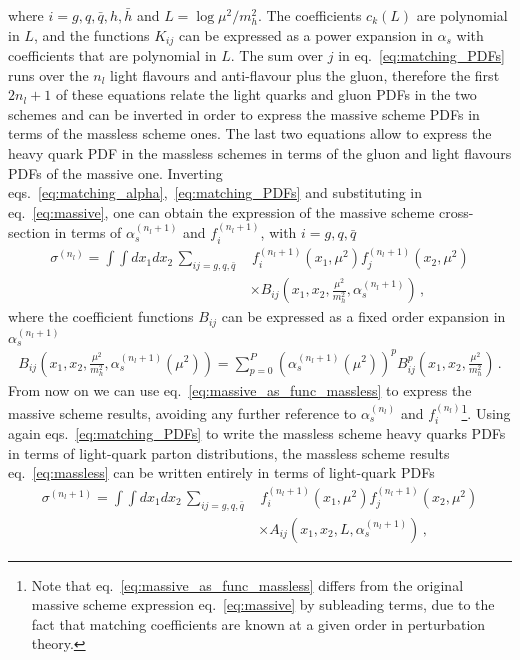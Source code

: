 where $i = g, q, \bar{q}, h, \bar{h}$ and $L = \log \mu^2/m_h^2$. The coefficients $c_k\left(L\right)$ are polynomial in $L$,
and the functions $K_{ij}$ can be expressed as a power expansion in $\alpha_s$ with coefficients
that are polynomial in $L$. The sum over $j$ in eq.~\eqref{eq:matching_PDFs}
runs over the $n_l$ light flavours and anti-flavour plus the gluon, therefore the first $2n_l+1$
of these equations relate the light quarks and gluon PDFs in the two schemes and can be inverted in
order to express the massive scheme PDFs in terms of the massless scheme ones. The last two equations
allow to express the heavy quark PDF in the massless schemes in terms of the gluon and light flavours PDFs of the massive one.
%
Inverting eqs.~\eqref{eq:matching_alpha},~\eqref{eq:matching_PDFs} and substituting in eq.~\eqref{eq:massive},
one can obtain the expression of the massive scheme cross-section in terms of $\alpha_s^{(n_l+1)}$
and $f_i^{(n_l+1)}$, with $i = g,q,\bar{q}$
\begin{align}
    \label{eq:massive_as_func_massless}
    \sigma^{(n_l)} = \int \int dx_1 dx_2\, \sum_{ij = g,q,\bar{q} }&\, 
    f_i^{(n_l+1)}\left(x_1,\mu^2\right)f_j^{(n_l+1)}\left(x_2,\mu^2\right) \nonumber \\
    &\times B_{ij}\left(x_1,x_2,\frac{\mu^2}{m_h^2},\alpha_s^{(n_l+1)}\right)\,,
\end{align}
where the coefficient functions $B_{ij}$ can be expressed as a fixed order expansion in $\alpha_s^{(n_l+1)}$
\begin{align}
    \label{eq:massive_1}
    B_{ij}\left(x_1,x_2,\frac{\mu^2}{m_h^2},\alpha_s^{(n_l+1)}\left(\mu^2\right)\right)
    = \sum_{p=0}^P \left(\alpha_s^{(n_l+1)}\left(\mu^2\right)\right)^p B_{ij}^p\left(x_1,x_2,\frac{\mu^2}{m_h^2}\right)\,.
\end{align}
From now on we can use eq.~\eqref{eq:massive_as_func_massless} to express the massive scheme results, avoiding
any further reference to $\alpha_s^{(n_l)}$ and $f_i^{(n_l)}$\footnote{Note that eq.~\eqref{eq:massive_as_func_massless}
differs from the original massive scheme expression eq.~\eqref{eq:massive} by subleading terms,
due to the fact that matching coefficients are known at a given order in perturbation theory.}.
Using again eqs.~\eqref{eq:matching_PDFs} to write the massless scheme heavy quarks PDFs in terms of light-quark parton
distributions, the massless scheme results eq.~\eqref{eq:massless} can be written entirely in terms of 
light-quark PDFs
\begin{align}
    \label{eq:massless_1}
    \sigma^{(n_l+1)} = \int \int dx_1 dx_2\, \sum_{ij=g,q,\bar{q}}&\, 
    f_i^{(n_l+1)}\left(x_1,\mu^2\right)f_j^{(n_l+1)}\left(x_2,\mu^2\right) \nonumber \\
    &\times A_{ij}\left(x_1,x_2,L,\alpha_s^{(n_l+1)}\right)\,,
\end{align}
